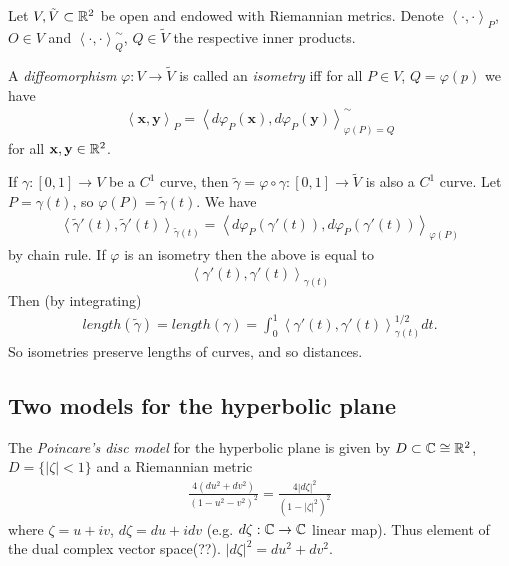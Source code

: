 \documentclass[a4paper]{article}
\begin{document}
\begin{defi}
Let $V,\tilde{V} \subset \mathbb{R}^2$ be open and endowed with Riemannian metrics. Denote $\left<\cdot,\cdot\right>_P$, $O \in V$ and $\left<\cdot,\cdot\right>^{\sim}_Q$, $Q \in \tilde{V}$ the respective inner products.

A \emph{diffeomorphism} $\varphi:V \to \tilde{V}$ is called an \emph{isometry} iff for all $P \in V$, $Q = \varphi(p)$ we have
\begin{equation*}
\begin{aligned}
\left<\mathbf{x},\mathbf{y}\right>_P = \left<d\varphi_P(\mathbf{x}),d\varphi_P(\mathbf{y})\right>^\sim_{\varphi(P) =Q}
\end{aligned}
\end{equation*}
for all $\mathbf{x},\mathbf{y} \in \mathbb{R}^2$.
\end{defi}

If $\gamma:[0,1]\to V$ be a $C^1$ curve, then $\tilde{\gamma} = \varphi \circ \gamma: [0,1] \to \tilde{V}$ is also a $C^1$ curve. Let $P=\gamma(t)$, so $\varphi(P) = \tilde{\gamma}(t)$. We have
\begin{equation*}
\begin{aligned}
\left<\tilde{\gamma}'(t),\tilde{\gamma}'(t)\right>_{\tilde{\gamma}(t)} = \left<d\varphi_P (\gamma'(t)),d\varphi_P (\gamma'(t))\right>_{\varphi(P)}
\end{aligned}
\end{equation*}
by chain rule. If $\varphi$ is an isometry then the above is equal to
\begin{equation*}
\begin{aligned}
\left<\gamma'(t),\gamma'(t)\right>_{\gamma(t)}
\end{aligned}
\end{equation*}
Then (by integrating)
\begin{equation*}
\begin{aligned}
length(\tilde{\gamma}) = length(\gamma) = \int_0^1 \left<\gamma'(t),\gamma'(t)\right>^{1/2}_{\gamma(t)} dt.
\end{aligned}
\end{equation*}
So isometries preserve lengths of curves, and so distances.

\subsection{Two models for the hyperbolic plane}
\begin{defi}
The \emph{Poincare's disc model} for the hyperbolic plane is given by $D \subset \mathbb{C} \cong \mathbb{R}^2$, $D = \{|\zeta|<1\}$ and a Riemannian metric
\begin{equation*}\tag{*}
\begin{aligned}
\frac{4(du^2+dv^2)}{(1-u^2-v^2)^2} = \frac{4|d\zeta|^2}{(1-|\zeta|^2)^2}
\end{aligned}
\end{equation*}
where $\zeta = u+iv$, $d\zeta = du+idv$ (e.g. $d\zeta:\mathbb{C} \to \mathbb{C}$ linear map). Thus element of the dual complex vector space(??). $|d\zeta|^2 = du^2 + dv^2$.
\end{defi}
\end{document}
